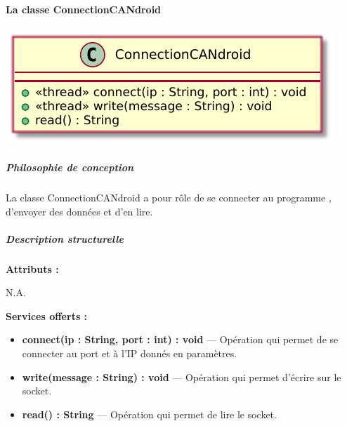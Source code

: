 \paragraph{La classe ConnectionCANdroid}

\begin{minipage}
    {\linewidth}
    \centering
    \includegraphics[width=0.5\linewidth]{../schemas/Conception_detaillee/classe_connectionCANdroid.pdf}
\end{minipage}

\subparagraph{Philosophie de conception \newline} 

\medspace

La classe ConnectionCANdroid a pour rôle de se connecter au programme {\nomLogiciel}, d'envoyer des données et d'en lire. 

\subparagraph{Description structurelle \newline}

\medspace

\textbf{Attributs :}

N.A.

\textbf{Services offerts :}

\begin{itemize}
    \item \textbf{connect(ip : String, port : int) : void} --- Opération qui permet de se connecter au port et à l'IP donnés en paramètres. 
    \item \textbf{write(message : String) : void } --- Opération qui permet d'écrire sur le socket.  
    \item \textbf{read() : String } --- Opération qui permet de lire le socket.
\end{itemize}